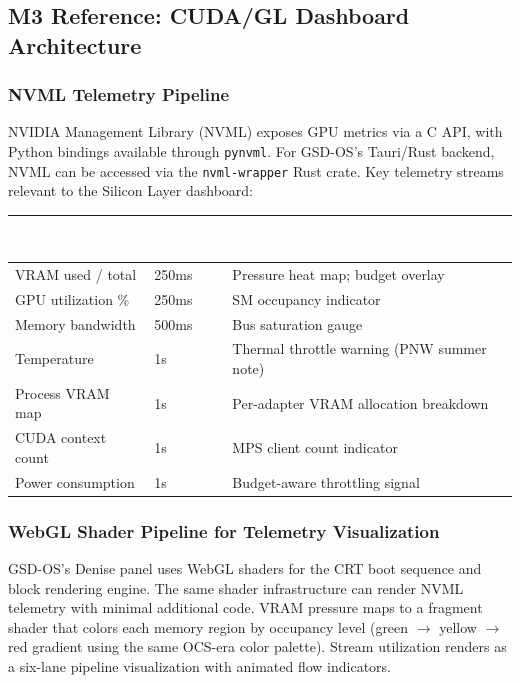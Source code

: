 \documentclass[11pt,letterpaper]{article}
\newcommand{\tableheader}[1]{\textbf{\sffamily\textcolor{white}{#1}}}
\begin{document}
\subsection{M3 Reference: CUDA/GL Dashboard Architecture}

\subsubsection{NVML Telemetry Pipeline}

NVIDIA Management Library (NVML) exposes GPU metrics via a C API, with Python bindings available through \texttt{pynvml}. For GSD-OS's Tauri/Rust backend, NVML can be accessed via the \texttt{nvml-wrapper} Rust crate. Key telemetry streams relevant to the Silicon Layer dashboard:

\begin{center}
\begin{tabularx}{\textwidth}{L{3.5cm}L{2cm}X}
\toprule
{}
\tableheader{Metric} & \tableheader{Poll Rate} & \tableheader{Dashboard Use} \\
\midrule
VRAM used / total & 250ms & Pressure heat map; budget overlay \\
GPU utilization \% & 250ms & SM occupancy indicator \\
Memory bandwidth & 500ms & Bus saturation gauge \\
Temperature & 1s & Thermal throttle warning (PNW summer note) \\
Process VRAM map & 1s & Per-adapter VRAM allocation breakdown \\
CUDA context count & 1s & MPS client count indicator \\
Power consumption & 1s & Budget-aware throttling signal \\
\bottomrule
\end{tabularx}
\end{center}

\subsubsection{WebGL Shader Pipeline for Telemetry Visualization}

GSD-OS's Denise panel uses WebGL shaders for the CRT boot sequence and block rendering engine. The same shader infrastructure can render NVML telemetry with minimal additional code. VRAM pressure maps to a fragment shader that colors each memory region by occupancy level (green $\rightarrow$ yellow $\rightarrow$ red gradient using the same OCS-era color palette). Stream utilization renders as a six-lane pipeline visualization with animated flow indicators.
\end{document}
